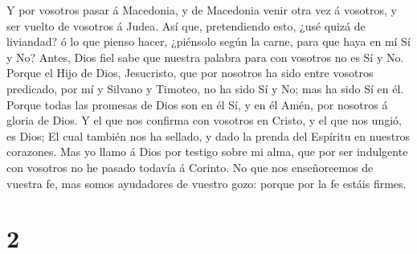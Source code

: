  Y por vosotros pasar á Macedonia, y de Macedonia venir
otra vez á vosotros, y ser vuelto de vosotros á Judea.  Así
que, pretendiendo esto, ¿usé quizá de liviandad? ó lo que pienso hacer,
¿piénsolo según la carne, para que haya en mí Sí y No? 
Antes, Dios fiel sabe que nuestra palabra para con vosotros no es Sí y
No.~ Porque el Hijo de Dios, Jesucristo, que por nosotros
ha sido entre vosotros predicado, por mí y Silvano y Timoteo, no ha sido
Sí y No; mas ha sido Sí en él.  Porque todas las promesas
de Dios son en él Sí, y en él Amén, por nosotros á gloria de Dios.
 Y el que nos confirma con vosotros en Cristo, y el que nos
ungió, es Dios;  El cual también nos ha sellado, y dado la
prenda del Espíritu en nuestros corazones.  Mas yo llamo á
Dios por testigo sobre mi alma, que por ser indulgente con vosotros no
he pasado todavía á Corinto.  No que nos enseñoreemos de
vuestra fe, mas somos ayudadores de vuestro gozo: porque por la fe
estáis firmes.

\hypertarget{section-1}{%
\section{2}\label{section-1}}

